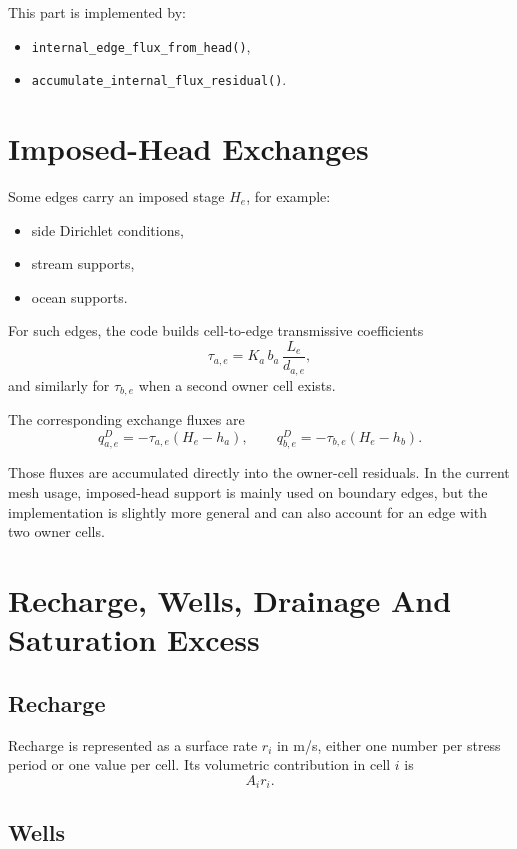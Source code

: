 \documentclass[11pt,a4paper]{article}
\begin{document}
This part is implemented by:

\begin{itemize}
\item \texttt{internal\_edge\_flux\_from\_head()},
\item \texttt{accumulate\_internal\_flux\_residual()}.
\end{itemize}

\section{Imposed-Head Exchanges}

Some edges carry an imposed stage $H_e$, for example:

\begin{itemize}
\item side Dirichlet conditions,
\item stream supports,
\item ocean supports.
\end{itemize}

For such edges, the code builds cell-to-edge transmissive coefficients
\[
\tau_{a,e} = K_a\,b_a\,\frac{L_e}{d_{a,e}},
\]
and similarly for $\tau_{b,e}$ when a second owner cell exists.

The corresponding exchange fluxes are
\[
q^{D}_{a,e} = -\tau_{a,e}(H_e - h_a),
\qquad
q^{D}_{b,e} = -\tau_{b,e}(H_e - h_b).
\]

Those fluxes are accumulated directly into the owner-cell residuals. In the
current mesh usage, imposed-head support is mainly used on boundary edges, but
the implementation is slightly more general and can also account for an edge
with two owner cells.

\section{Recharge, Wells, Drainage And Saturation Excess}

\subsection{Recharge}

Recharge is represented as a surface rate $r_i$ in m/s, either one number per
stress period or one value per cell. Its volumetric contribution in cell $i$ is
\[
A_i r_i.
\]

\subsection{Wells}
\end{document}
